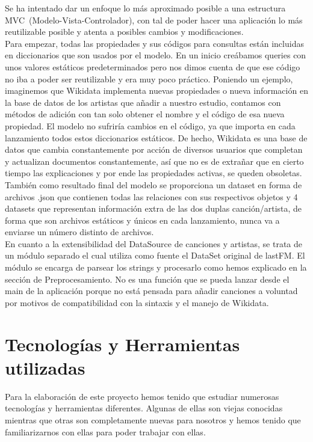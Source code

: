 Se ha intentado dar un enfoque lo más aproximado posible a una estructura MVC~(Modelo-Vista-Controlador), con tal de poder hacer una aplicación lo más reutilizable posible y atenta a posibles cambios y modificaciones.\\

Para empezar, todas las propiedades y sus códigos para consultas están incluidas en diccionarios que son usados por el modelo. En un inicio creábamos queries con unos valores estáticos predeterminados pero nos dimos cuenta de que ese código no iba a poder ser reutilizable y era muy poco práctico. Poniendo un ejemplo, imaginemos que Wikidata implementa nuevas propiedades o nueva información en la base de datos de los artistas que añadir a nuestro estudio, contamos con métodos de adición con tan solo obtener el nombre y el código de esa nueva propiedad. El modelo no sufriría cambios en el código, ya que importa en cada lanzamiento todos estos diccionarios estáticos. De hecho, Wikidata es una base de datos que cambia constantemente por acción de diversos usuarios que completan y actualizan documentos constantemente, así que no es de extrañar que en cierto tiempo las explicaciones y por ende las propiedades activas, se queden obsoletas.\\

También como resultado final del modelo se proporciona un dataset en forma de archivos .json que contienen todas las relaciones con sus respectivos objetos y 4 datasets que representan información extra de las dos duplas canción/artista, de forma que son archivos estáticos y únicos en cada lanzamiento, nunca va a enviarse un número distinto de archivos.\\

En cuanto a la extensibilidad del DataSource de canciones y artistas, se trata de un módulo separado el cual utiliza como fuente el DataSet original de lastFM. El módulo se encarga de parsear los strings y procesarlo como hemos explicado en la sección de Preprocesamiento. No es una función que se pueda lanzar desde el main de la aplicación porque no está pensada para añadir canciones a voluntad por motivos de compatibilidad con la sintaxis y el manejo de Wikidata.\\

\section{Tecnologías y Herramientas utilizadas}
\label{sec:tecnologias}

Para la elaboración de este proyecto hemos tenido que estudiar numerosas tecnologías y herramientas diferentes. Algunas de ellas son viejas conocidas mientras que otras son completamente nuevas para nosotros y hemos tenido que familiarizarnos con ellas para poder trabajar con ellas.\\

